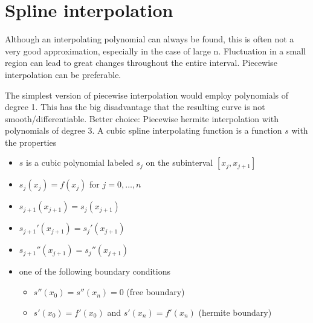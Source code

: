 \section{Spline interpolation}\label{sec:spline-interpolation}
Although an interpolating polynomial can always be found, this is often not a very good approximation, especially in the case of large n.
Fluctuation in a small region can lead to great changes throughout the entire interval.
Piecewise interpolation can be preferable.

The simplest version of piecewise interpolation would employ polynomials of degree 1.
This has the big disadvantage that the resulting curve is not smooth/differentiable.
Better choice: Piecewise hermite interpolation with polynomials of degree 3.
A cubic spline interpolating function is a function $s$ with the properties
\begin{itemize}
    \item $s$ is a cubic polynomial labeled $s_j$ on the subinterval $[x_j, x_{j+1}]$
    \item $s_j(x_j) = f(x_j)$ for $j = 0, \ldots, n$
    \item $s_{j+1}(x_{j+1}) =s_j(x_{j+1})$
    \item $s_{j+1}'(x_{j+1}) =s_j'(x_{j+1})$
    \item $s_{j+1}''(x_{j+1}) =s_j''(x_{j+1})$
    \item one of the following boundary conditions
    \begin{itemize}
        \item $s''(x_0)=s''(x_n) = 0$ (free boundary)
        \item $s'(x_0) = f'(x_0)$ and $s'(x_n) = f'(x_n)$ (hermite boundary)
    \end{itemize}
\end{itemize}


